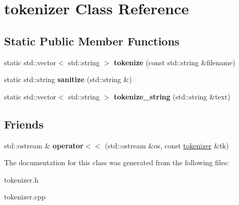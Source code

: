 \hypertarget{classtokenizer}{}\section{tokenizer Class Reference}
\label{classtokenizer}
\subsection*{Static Public Member Functions}
\begin{DoxyCompactItemize}
\item 
\mbox{\label{classtokenizer_aa1a768f007e710ff25d63a2cb1de83c3}} 
static std\+::vector$<$ std\+::string $>$ {\bfseries tokenize} (const std\+::string \&filename)
\item 
\mbox{\label{classtokenizer_a5d553b843e67154be958b849fbf20b62}} 
static std\+::string {\bfseries sanitize} (std\+::string \&)
\item 
\mbox{\label{classtokenizer_a9fbc8f511d0eeb0ca2f0333612c99a2a}} 
static std\+::vector$<$ std\+::string $>$ {\bfseries tokenize\+\_\+string} (std\+::string \&text)
\end{DoxyCompactItemize}
\subsection*{Friends}
\begin{DoxyCompactItemize}
\item 
\mbox{\label{classtokenizer_af8ab6eab63d97d86eb0e8a22eb94aafc}} 
std\+::ostream \& {\bfseries operator$<$$<$} (std\+::ostream \&os, const \hyperlink{classtokenizer}{tokenizer} \&tk)
\end{DoxyCompactItemize}


The documentation for this class was generated from the following files\+:\begin{DoxyCompactItemize}
\item 
tokenizer.\+h\item 
tokenizer.\+cpp\end{DoxyCompactItemize}
